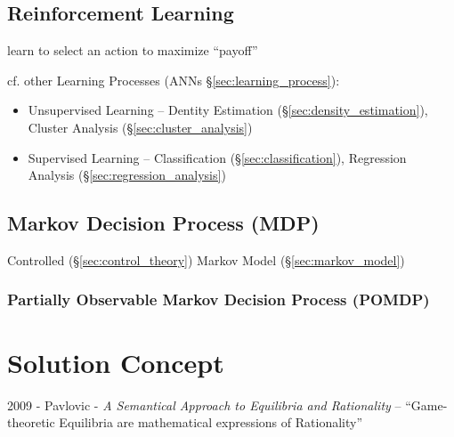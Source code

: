 \subsection{Reinforcement Learning}\label{sec:reinforcement_learning}

learn to select an action to maximize ``payoff''

cf. other Learning Processes (ANNs \S\ref{sec:learning_process}):
\begin{itemize}
  \item Unsupervised Learning -- Dentity Estimation
    (\S\ref{sec:density_estimation}), Cluster Analysis
    (\S\ref{sec:cluster_analysis})
  \item Supervised Learning -- Classification (\S\ref{sec:classification}),
    Regression Analysis (\S\ref{sec:regression_analysis})
\end{itemize}



\subsection{Markov Decision Process (MDP)}\label{sec:mdp}

Controlled (\S\ref{sec:control_theory}) Markov Model (\S\ref{sec:markov_model})



\subsubsection{Partially Observable Markov Decision Process (POMDP)}
\label{sec:pomdp}



\section{Solution Concept}\label{sec:solution_concept}

2009 - Pavlovic - \emph{A Semantical Approach to Equilibria and Rationality} --
``Game-theoretic Equilibria are mathematical expressions of Rationality''



